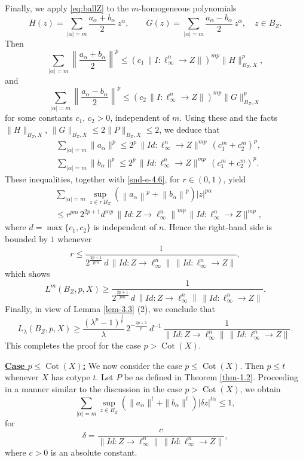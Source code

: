 \documentclass[a4paper,11pt, reqno]{amsart}
\theoremstyle{definition}
\newcommand{\norm}[1]{\left\lVert#1\right\rVert}
\begin{document}
Finally, we apply \eqref{eq:ballZ} to the $m$-homogeneous polynomials
\[
H(z)=\sum_{|\alpha|=m}\frac{a_\alpha+b_\alpha}{2}\,z^\alpha,
\qquad
G(z)=\sum_{|\alpha|=m}\frac{a_\alpha-b_\alpha}{2}\,z^\alpha,
\quad z\in B_Z.
\]
Then
\[
\sum_{|\alpha|=m}\left\|\frac{a_\alpha+b_\alpha}{2}\right\|^p
\le (c_1\,\|I:\ell_\infty^n\to Z\|)^{mp}\|H\|_{B_Z,X}^p,
\]
and
\[
\sum_{|\alpha|=m}\left\|\frac{a_\alpha-b_\alpha}{2}\right\|^p
\le (c_2\,\|I:\ell_\infty^n\to Z\|)^{mp}\|G\|_{B_Z,X}^p
\]
for some constants $c_1,\,c_2>0$, independent of $m$.
Using these and the facts $\|H\|_{B_Z,X},\, \|G\|_{B_Z,X}\le 2\|P\|_{B_Z,X}\le 2$, we deduce that
\begin{align*}
	&\sum_{|\alpha|=m}\|a_\alpha\|^p
	\le 2^{p} \, \|Id:\ell_\infty^n\to Z\|^{mp} \,(c^m_1+c^m_2)^{p},\\
	& \sum_{|\alpha|=m}\|b_\alpha\|^p
	\le 2^{p} \, \|Id:\ell_\infty^n\to Z\|^{mp} \, (c^m_1+c^m_2)^{p}.
\end{align*}
These inequalities, together with \eqref{snd-e-4.6}, for $r \in (0,1)$, yield
\begin{align*}
	& \sum_{|\alpha|=m} \sup_{z \in r \, B_{Z}} (\norm{a_{\alpha}}^p+\norm{b_{\alpha}}^p)|z|^{p\alpha}\\
	& \leq r^{pm}\,2^{2p+1} d^{mp}\, \norm{Id: Z \rightarrow \ell^n_\infty}^{mp}\, \|Id:\ell_\infty^n\to Z\|^{mp}, 
\end{align*} 
where $d= \max\{c_1,c_2\}$ is independent of $n$.
Hence the right-hand side is bounded by $1$ whenever
\[
r\le \frac{1}{2^{\frac{2p+1}{pm}}\,d\, \norm{Id: Z \rightarrow \ell^n_\infty}\,\|Id:\ell_\infty^n\to Z\|},
\]
which shows
\[
L^m(B_{Z}, p,X)\geq \frac{1}{2^{\frac{2p+1}{pm}}\, d\, \norm{Id: Z \rightarrow \ell^n_\infty}\,\|Id:\ell_\infty^n\to Z\|}.
\]
Finally, in view of Lemma \ref{lem-3.3} (2), we conclude that
\begin{equation*}
	L_{\lambda}(B_{Z}, p,X) \geq \dfrac{\left(\lambda^p -1\right)^{\frac{1}{p}}}{\lambda}\, 2^{-\frac{2p+1}{p}}\, d^{-1}\,  \frac{1}{ \norm{Id: Z \rightarrow \ell^n_\infty}\,\|Id:\ell_\infty^n\to Z\|}.
\end{equation*}
This completes the proof for the case $p>\operatorname{Cot}(X)$.

\medskip
\noindent
\underline{\textbf{Case $p \leq \operatorname{Cot}(X)$:}}
We now consider the case $p \leq \operatorname{Cot}(X)$. Then $p \leq t$ whenever $X$ has cotype $t$. 
Let $P$ be as defined in Theorem \ref{thm-1.2}. Proceeding in a manner similar to the discussion in the case $p>\operatorname{Cot}(X)$, we obtain
\begin{equation}\label{eq:main1}
	\sum_{|\alpha|=m}\sup_{z\in B_Z} \left( \|a_\alpha\|^t+\|b_\alpha\|^t \right)|\delta z|^{t\alpha}\leq 1,
\end{equation}
for
\[
\delta=\frac{c}{\|Id: Z\to \ell_\infty^n\|\,\|Id:\ell_\infty^n\to Z\|},
\]
where $c>0$ is an absolute constant.
\end{document}
